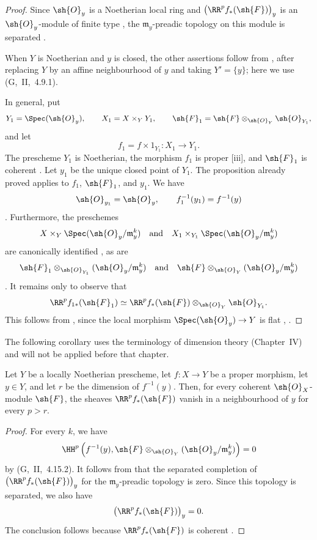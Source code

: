 \begin{proof}
Since $\sh{O}_y$ is a Noetherian local ring and
$\bigl(\RR^p f_*(\sh{F})\bigr)_y$ is an $\sh{O}_y$-module of finite
type , the $\mathfrak{m}_y$-preadic topology on this
module is separated .

When $Y$ is Noetherian and $y$ is closed, the other assertions follow
from , after replacing $Y$ by an affine neighbourhood
of $y$ and taking $Y'=\{y\}$; here we use (G,~II,~4.9.1).

In general, put
\[
  Y_1=\Spec(\sh{O}_y),
  \qquad
  X_1=X\times_Y Y_1,
  \qquad
  \sh{F}_1
  =
  \sh{F}\otimes_{\sh{O}_Y}\sh{O}_{Y_1},
\]
and let
\[
  f_1=f\times 1_{Y_1}:X_1\longrightarrow Y_1.
\]
The prescheme $Y_1$ is Noetherian, the morphism $f_1$ is proper
[iii], and $\sh{F}_1$ is coherent
.
Let $y_1$ be the unique closed point of $Y_1$.
The proposition already proved applies to $f_1$, $\sh{F}_1$, and
$y_1$.
We have
\[
  \sh{O}_{y_1}=\sh{O}_y,
  \qquad
  f_1^{-1}(y_1)=f^{-1}(y)
\]
.
Furthermore, the preschemes
\[
  X\times_Y\Spec(\sh{O}_y/\mathfrak{m}_y^k)
  \quad\text{and}\quad
  X_1\times_{Y_1}\Spec(\sh{O}_y/\mathfrak{m}_y^k)
\]
are canonically identified , as are
\[
  \sh{F}_1
  \otimes_{\sh{O}_{Y_1}}
  (\sh{O}_y/\mathfrak{m}_y^k)
  \quad\text{and}\quad
  \sh{F}
  \otimes_{\sh{O}_Y}
  (\sh{O}_y/\mathfrak{m}_y^k)
\]
.
It remains only to observe that
\[
  \RR^p f_{1*}(\sh{F}_1)
  \simeq
  \RR^p f_*(\sh{F})
  \otimes_{\sh{O}_Y}
  \sh{O}_{Y_1}.
\]
This follows from , since the local morphism
$\Spec(\sh{O}_y)\to Y$ is flat
, .
\end{proof}

The following corollary uses the terminology of dimension theory
(Chapter~IV) and will not be applied before that chapter.

\begin{corollary}[4.2.2]
\label{III.4.2.2}
Let $Y$ be a locally Noetherian prescheme, let $f:X\to Y$ be a
proper morphism, let $y\in Y$, and let $r$ be the dimension of
$f^{-1}(y)$.
Then, for every coherent $\sh{O}_X$-module $\sh{F}$, the sheaves
$\RR^p f_*(\sh{F})$ vanish in a neighbourhood of $y$ for every
$p>r$.
\end{corollary}

\begin{proof}
For every $k$, we have
\[
  \HH^p\left(
    f^{-1}(y),
    \sh{F}\otimes_{\sh{O}_Y}
    (\sh{O}_y/\mathfrak{m}_y^k)
  \right)
  =
  0
\]
by (G,~II,~4.15.2).
It follows from  that the separated completion of
$\bigl(\RR^p f_*(\sh{F})\bigr)_y$ for the
$\mathfrak{m}_y$-preadic topology is zero.
Since this topology is separated, we also have
\[
  \bigl(\RR^p f_*(\sh{F})\bigr)_y=0.
\]
The conclusion follows because $\RR^p f_*(\sh{F})$ is coherent
.
\end{proof}

